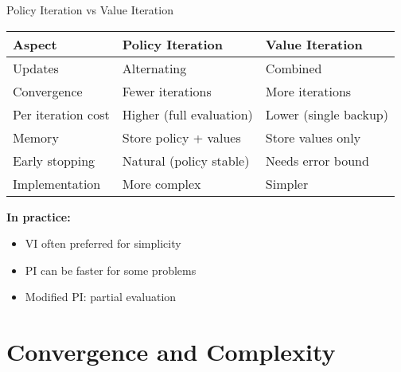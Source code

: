 \documentclass[aspectratio=169,10pt]{beamer}
\begin{document}
\begin{frame}{Policy Iteration vs Value Iteration}
\begin{center}
\begin{tabular}{|l|l|l|}
\hline
\textbf{Aspect} & \textbf{Policy Iteration} & \textbf{Value Iteration} \\
\hline
Updates & Alternating & Combined \\
Convergence & Fewer iterations & More iterations \\
Per iteration cost & Higher (full evaluation) & Lower (single backup) \\
Memory & Store policy + values & Store values only \\
Early stopping & Natural (policy stable) & Needs error bound \\
Implementation & More complex & Simpler \\
\hline
\end{tabular}
\end{center}

\vspace{0.5cm}
\textbf{In practice:}
\begin{itemize}
    \item VI often preferred for simplicity
    \item PI can be faster for some problems
    \item Modified PI: partial evaluation
\end{itemize}
\end{frame}

\section{Convergence and Complexity}
\end{document}
